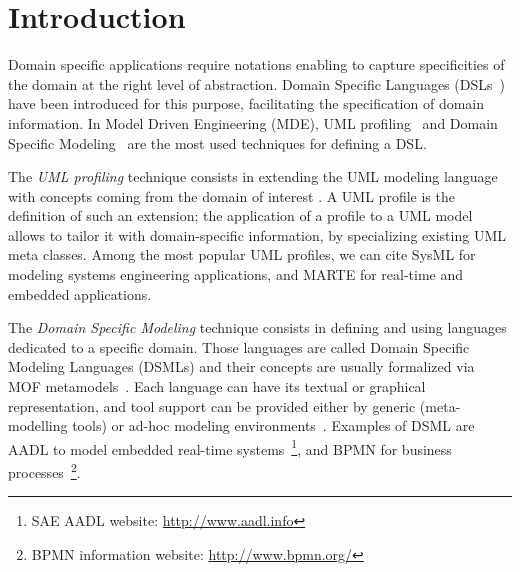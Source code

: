 \section{Introduction}\label{sec:intro}

Domain specific applications require notations enabling to capture specificities of the domain at the right level of abstraction. Domain Specific Languages (DSLs~\cite{FowlerBook}) have been introduced for this purpose, facilitating the specification of domain information. In Model Driven Engineering (MDE), UML profiling~\cite{UML} and Domain Specific Modeling~\cite{DSML} are the most used techniques for defining a DSL.

The \textit{UML profiling} technique consists in extending the UML modeling language with concepts coming from
the domain of interest \cite{UML}.
A UML profile is the definition of such an extension; the application of a profile to a UML model allows to tailor it with domain-specific information, by specializing existing UML meta classes. Among the most popular UML profiles, we can cite SysML \cite{sysml}
for modeling systems engineering applications, and MARTE \cite{marte} for real-time and embedded applications.

The \textit{Domain Specific Modeling} technique consists in defining and using languages dedicated to a specific domain.
Those languages are called Domain Specific Modeling Languages (DSMLs) and their concepts are usually formalized  via MOF metamodels~\cite{MOF}.
Each language can have its textual or graphical representation, and tool support can be provided either by generic (meta-modelling tools) or
ad-hoc modeling environments~\cite{DSML}.
Examples of DSML are AADL to model embedded real-time systems~\footnote{SAE AADL website: \small{\url{http://www.aadl.info}}}, 
and BPMN for business processes~\footnote{BPMN information website: \small{\url{http://www.bpmn.org/}}}.

